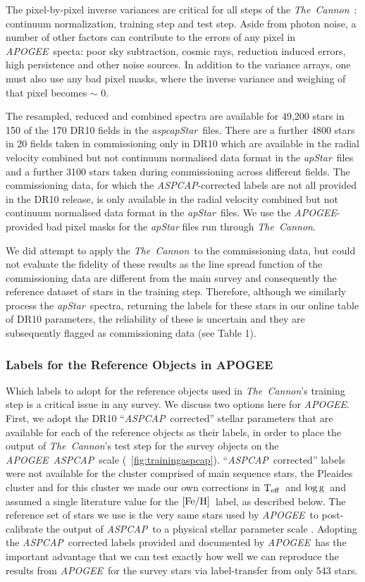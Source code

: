 \documentclass[12pt, preprint]{aastex}
\newcommand{\tc}{\textsl{The~Cannon}}
\newcommand{\apogee}{\textsl{APOGEE}}
\newcommand{\aspcap}{\textsl{ASPCAP}}
\newcommand{\aspcapstar}{\textsl{aspcapStar}}
\newcommand{\apstar}{\textsl{apStar}}
\newcommand{\teff}{\mbox{$\rm T_{eff}$}}
\newcommand{\feh}{\mbox{$\rm [Fe/H]$}}
\newcommand{\logg}{\mbox{$\rm \log g$}}
\begin{document}
The pixel-by-pixel inverse variances are critical for all steps of the \tc\ : continuum normalization, training step and test step.
Aside from photon noise, a number of other factors can contribute to the errors of any pixel in \apogee\ specta: poor sky subtraction, cosmic rays, reduction induced errors, high persistence and other noise sources. In addition to the variance arrays, one must also use any bad pixel masks, where the
inverse variance and weighing of that pixel becomes $\sim$ 0. 

The resampled, reduced and combined spectra are available for 49,200 stars in 150 of the 170 DR10 fields in the \aspcapstar\ files. There are a further 4800 stars in 20 fields taken in commissioning only in DR10 which are available in the radial velocity combined but not continuum normalised data format in the \apstar\ files and a further 3100 stars taken during commissioning across different fields. 
The commissioning data, for which the \aspcap-corrected labels are not all provided in the DR10 release, is only available in the radial velocity combined but not continuum normalised data format in the \apstar\ files. 
We use the \apogee -provided bad pixel masks for the \textit{apStar} files run through \tc .

We did attempt to apply the \tc\ to the commissioning data, but could not evaluate the fidelity of these results as the line spread function of the commissioning data are different from the main survey and consequently the reference dataset of stars in the training step. 
Therefore, although we similarly process the \apstar\ spectra, returning the labels for these stars in our online table of DR10 parameters, the reliability of these is uncertain and they are subsequently flagged as commissioning data (see Table 1).


\subsubsection{Labels for the Reference Objects in APOGEE}
\label{sec:ApogeeRefLabels}

Which labels to adopt for the reference objects used in \tc 's training step is a critical issue
in any survey. We discuss two options here for \apogee . 
First, we adopt the DR10 ``\aspcap\ corrected'' stellar parameters that are available for each of the reference objects as their labels, in order to place the output of \tc 's test step for the survey objects on the \apogee\ \aspcap\ scale (\figurename~\ref{fig:trainingaspcap}). ``\aspcap\ corrected'' labels were not available for the cluster comprised of main sequence stars, the Pleaides cluster and for this cluster we made our own corrections in \teff\ and \logg\ and assumed a single literature value for the \feh\ label, as described below. 
The reference set of stars we use is the very same stars used by \apogee\ to post-calibrate the output of \aspcap\ to a physical stellar parameter scale \citep{Meszaros2013}.
Adopting the \aspcap\ corrected labels provided and documented by \apogee\ has the important advantage 
that we can test exactly how well we can reproduce the results from \apogee\ for the survey stars via label-transfer from only 543 stars.
\end{document}
